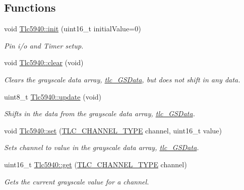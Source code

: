 \subsection*{Functions}
\begin{DoxyCompactItemize}
\item 
void \hyperlink{group__CoreFunctions_gaa42fdda37a43a13f49b00924d93eedd4}{Tlc5940\+::init} (uint16\+\_\+t initial\+Value=0)
\begin{DoxyCompactList}\small\item\em Pin i/o and Timer setup. \end{DoxyCompactList}\item 
void \hyperlink{group__CoreFunctions_ga5e5acd62f0c91579694ed4cffd88bd76}{Tlc5940\+::clear} (void)
\begin{DoxyCompactList}\small\item\em Clears the grayscale data array, \hyperlink{Tlc5940_8h_a1560009c42233131f7abe72e8113f793}{tlc\+\_\+\+G\+S\+Data}, but does not shift in any data. \end{DoxyCompactList}\item 
uint8\+\_\+t \hyperlink{group__CoreFunctions_ga18ee51310250855d75cff715a5ff4d48}{Tlc5940\+::update} (void)
\begin{DoxyCompactList}\small\item\em Shifts in the data from the grayscale data array, \hyperlink{Tlc5940_8h_a1560009c42233131f7abe72e8113f793}{tlc\+\_\+\+G\+S\+Data}. \end{DoxyCompactList}\item 
void \hyperlink{group__CoreFunctions_ga3d487c503365fa5b948b6711b9dac73e}{Tlc5940\+::set} (\hyperlink{tlc__config_8h_ab23dc44a3be02131509f5ab61f68530e}{T\+L\+C\+\_\+\+C\+H\+A\+N\+N\+E\+L\+\_\+\+T\+Y\+PE} channel, uint16\+\_\+t value)
\begin{DoxyCompactList}\small\item\em Sets channel to value in the grayscale data array, \hyperlink{Tlc5940_8h_a1560009c42233131f7abe72e8113f793}{tlc\+\_\+\+G\+S\+Data}. \end{DoxyCompactList}\item 
uint16\+\_\+t \hyperlink{group__CoreFunctions_gac712fcd944dd3f5f4f0ff158d754ea06}{Tlc5940\+::get} (\hyperlink{tlc__config_8h_ab23dc44a3be02131509f5ab61f68530e}{T\+L\+C\+\_\+\+C\+H\+A\+N\+N\+E\+L\+\_\+\+T\+Y\+PE} channel)
\begin{DoxyCompactList}\small\item\em Gets the current grayscale value for a channel. \end{DoxyCompactList}\item 

\end{DoxyCompactItemize}
